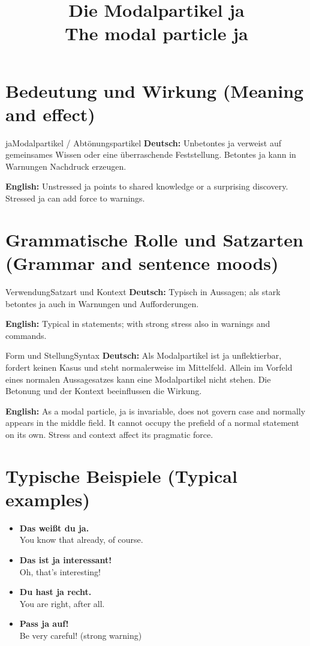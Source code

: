 \documentclass[a4paper,11pt]{article}
\title{Die Modalpartikel \glqq ja\grqq\\{\large\textnormal{The modal particle ja}}}
\date{}
\newcommand{\GermanText}[1]{\textbf{Deutsch: }#1\par}
\newcommand{\EnglishText}[1]{{\small\color{SoftGray}\textbf{English: }#1\par}}
\newcommand{\ExampleItem}[2]{\item \textbf{#1}\\{\small\color{SoftGray}#2}}
\begin{document}
\maketitle
\tableofcontents
\section{Bedeutung und Wirkung \textnormal{(Meaning and effect)}}
\begin{grammarentry}{ja}{Modalpartikel / Abtönungspartikel}
\GermanText{Unbetontes ja verweist auf gemeinsames Wissen oder eine überraschende Feststellung. Betontes ja kann in Warnungen Nachdruck erzeugen.}
\EnglishText{Unstressed ja points to shared knowledge or a surprising discovery. Stressed ja can add force to warnings.}
\end{grammarentry}
\section{Grammatische Rolle und Satzarten \textnormal{(Grammar and sentence moods)}}
\begin{grammarentry}{Verwendung}{Satzart und Kontext}
\GermanText{Typisch in Aussagen; als stark betontes ja auch in Warnungen und Aufforderungen.}
\EnglishText{Typical in statements; with strong stress also in warnings and commands.}
\end{grammarentry}
\begin{grammarentry}{Form und Stellung}{Syntax}
\GermanText{Als Modalpartikel ist ja unflektierbar, fordert keinen Kasus und steht normalerweise im Mittelfeld. Allein im Vorfeld eines normalen Aussagesatzes kann eine Modalpartikel nicht stehen. Die Betonung und der Kontext beeinflussen die Wirkung.}
\EnglishText{As a modal particle, ja is invariable, does not govern case and normally appears in the middle field. It cannot occupy the prefield of a normal statement on its own. Stress and context affect its pragmatic force.}
\end{grammarentry}
\section{Typische Beispiele \textnormal{(Typical examples)}}
\begin{exbox}\begin{itemize}
\ExampleItem{Das weißt du ja.}{You know that already, of course.}
\ExampleItem{Das ist ja interessant!}{Oh, that's interesting!}
\ExampleItem{Du hast ja recht.}{You are right, after all.}
\ExampleItem{Pass ja auf!}{Be very careful! (strong warning)}
\end{itemize}\end{exbox}
\end{document}
